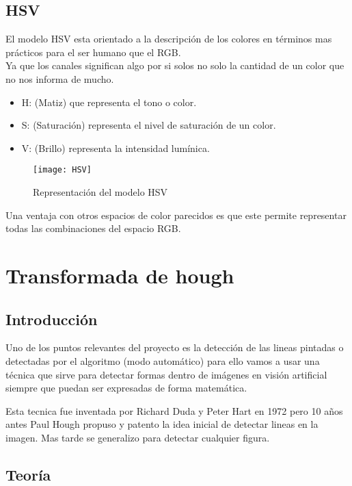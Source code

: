 \subsection{HSV}
El modelo HSV \cite{modelo:hsv} esta orientado a la descripción de los colores en términos mas prácticos para el ser humano que el RGB.\\
Ya que los canales significan algo por si solos no solo la cantidad de un color que no nos informa de mucho.
 
\begin{itemize}
	\item H: (Matiz) que representa el tono o color.\\
	\item S: (Saturación) representa el nivel de saturación de un color.\\
	\item V: (Brillo) representa la intensidad lumínica.\\
\end{itemize}
\begin{figure}[h]
\centering
\texttt{[image: HSV]}
\caption{Representación del modelo HSV}
\end{figure}
Una ventaja con otros espacios de color parecidos es que este permite representar todas las combinaciones del espacio RGB.

\section{Transformada de hough }

\subsection{Introducción}

Uno de los puntos relevantes del proyecto es la detección de las lineas pintadas o detectadas por el algoritmo (modo automático) para ello vamos a usar una técnica que sirve para detectar formas dentro de imágenes en visión artificial siempre que puedan ser expresadas de forma matemática.

Esta tecnica fue inventada por Richard Duda y Peter Hart en 1972 pero 10 años antes Paul Hough propuso y patento \cite{pat:patHough} la idea inicial de detectar lineas en la imagen. Mas tarde se generalizo para detectar cualquier figura.

\subsection{Teoría}

